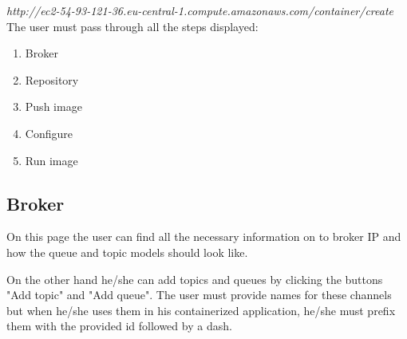 \textit{http://ec2-54-93-121-36.eu-central-1.compute.amazonaws.com/container/create}\\

The user must pass through all the steps displayed:

\begin{enumerate}
	\item Broker
	\item Repository
	\item Push image
	\item Configure
	\item Run image
\end{enumerate}

\newpage

\subsection{Broker}
\label{chap:05:01:01}

On this page the user can find all the necessary information on to broker IP and how the queue and topic models should look like.

On the other hand he/she can add topics and queues by clicking the buttons "Add topic" and "Add queue". The user must provide names for these channels but when he/she uses them in his containerized application, he/she must prefix them with the provided id followed by a dash.\\

